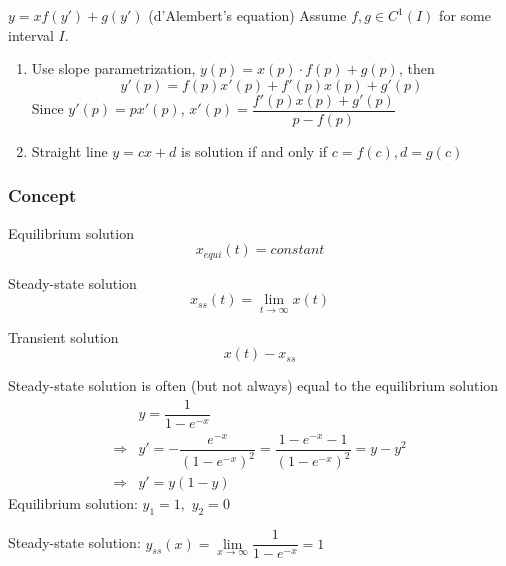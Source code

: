 \documentclass{beamer}
\begin{document}
\begin{frame}
\begin{block}{$y=xf(y')+g(y')$ (d'Alembert's equation)}
Assume $f,g\in C^1(I)$ for some interval $I$. 
\begin{enumerate}
\item Use slope parametrization, $y(p)=x(p)\cdot f(p)+g(p)$, then
$$y'(p)=f(p)x'(p)+f'(p)x(p)+g'(p)$$
Since $y'(p)=px'(p)$, $x'(p)=\dfrac{f'(p)x(p)+g'(p)}{p-f(p)}$
\item Straight line $y=cx+d$ is solution if and only if $c=f(c),d=g(c)$
\end{enumerate} 
\end{block}
\end{frame}

\begin{frame}
\frametitle{Concept}
\begin{block}{Equilibrium solution}
$$x_{equi}(t)=constant$$
\end{block}

\begin{block}{Steady-state solution}
$$x_{ss}(t)=\lim_{t\rightarrow\infty}x(t)$$
\end{block}

\begin{block}{Transient solution}
$$x(t)-x_{ss}$$
\end{block}
\end{frame}

\begin{frame}
\begin{block}{Steady-state solution is
often (but not always) equal to the equilibrium solution}
\begin{align*}
&y=\dfrac{1}{1-e^{-x}}\\
\Rightarrow&y'=-\dfrac{e^{-x}}{(1-e^{-x})^2}=\dfrac{1-e^{-x}-1}{(1-e^{-x})^2}=y-y^2\\
\Rightarrow&y'=y(1-y)
\end{align*}
Equilibrium solution: $y_1=1,$ $y_2=0$

Steady-state solution: $y_{ss}(x)=\lim\limits_{x\rightarrow\infty}\dfrac{1}{1-e^{-x}}=1$
\end{block}
\end{frame}
\end{document}
